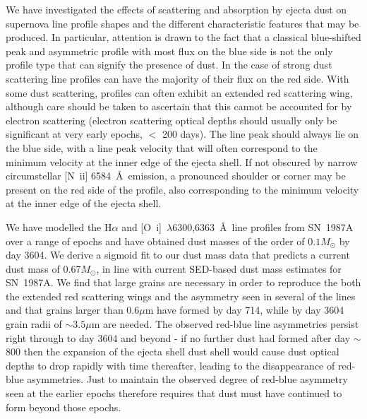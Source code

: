 \documentclass[useAMS,usenatbib,usegraphicx]{mnras}
\begin{document}
We have investigated the effects of scattering and absorption by ejecta 
dust on supernova line profile shapes and the different characteristic 
features that may be produced.  In particular, attention is drawn to the 
fact that a classical blue-shifted peak and asymmetric profile with most 
flux on the blue side is not the only profile type that can signify the 
presence of dust. In the case of strong dust scattering line profiles 
can have the majority of their flux on the red side. With some dust 
scattering, profiles can often exhibit an extended red scattering wing, 
although care should be taken to ascertain that this cannot be accounted 
for by electron scattering (electron scattering optical depths should 
usually only be significant at very early epochs, $<$ 200 days). The line 
peak should always lie on the blue side, with a line peak velocity that 
will often correspond to the minimum velocity at the inner edge of the 
ejecta shell. If not obscured by narrow circumstellar [N~{\sc ii}] 
6584~\AA\ emission, a pronounced shoulder or corner may be present on the 
red side of the profile, also corresponding to the minimum velocity at the 
inner edge of the ejecta shell.

We have modelled the H$\alpha$ and [O~{\sc i}]~$\lambda$6300,6363~\AA\ 
line profiles from SN~1987A over a range of epochs and have obtained dust 
masses of the order of $0.1M_{\odot}$ by day 3604.  We derive a sigmoid 
fit to our dust mass data that predicts a current dust mass of 
0.67$M_{\odot}$, in line with current SED-based dust mass estimates for 
SN~1987A.  We find that large grains are necessary in order to reproduce 
the both the extended red scattering wings and the asymmetry seen in 
several of the lines and that grains larger than $0.6\mu$m have formed by 
day 714, while by day 3604 grain radii of $\sim 3.5\mu$m are needed. The 
observed red-blue line asymmetries persist right through to day 3604 and 
beyond - if no further dust had formed after day $\sim$800 then the 
expansion of the ejecta shell dust shell would cause dust
optical depths to drop rapidly with time thereafter, leading to 
the disappearance of red-blue asymmetries. Just to maintain the observed 
degree of red-blue asymmetry seen at the earlier epochs therefore 
requires that dust must have continued to form beyond those epochs.


%
%
\end{document}

